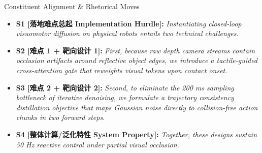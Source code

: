 \begin{TipBox}{Constituent Alignment \& Rhetorical Moves}
\begin{itemize}[leftmargin=1.5em]
  \item \textbf{S1 [落地难点总起 Implementation Hurdle]:} \textit{Instantiating closed-loop visuomotor diffusion on physical robots entails two technical challenges.}\par{}
  \item \textbf{S2 [难点 1 + 靶向设计 1]:} \textit{First, because raw depth camera streams contain occlusion artifacts around reflective object edges, we introduce a tactile-guided cross-attention gate that reweights visual tokens upon contact onset.}\par{}
  \item \textbf{S3 [难点 2 + 靶向设计 2]:} \textit{Second, to eliminate the 200 ms sampling bottleneck of iterative denoising, we formulate a trajectory consistency distillation objective that maps Gaussian noise directly to collision-free action chunks in two forward steps.}\par{}
  \item \textbf{S4 [整体计算/泛化特性 System Property]:} \textit{Together, these designs sustain 50 Hz reactive control under partial visual occlusion.}\par{}
\end{itemize}
\end{TipBox}
\bigskip
